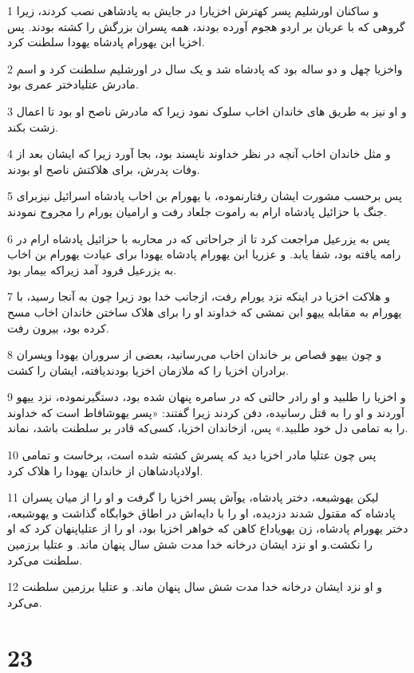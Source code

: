 \par 1 و ساکنان اورشلیم پسر کهترش اخزیارا در جایش به پادشاهی نصب کردند، زیرا گروهی که با عربان بر اردو هجوم آورده بودند، همه پسران بزرگش را کشته بودند. پس اخزیا ابن یهورام پادشاه یهودا سلطنت کرد.
\par 2 واخزیا چهل و دو ساله بود که پادشاه شد و یک سال در اورشلیم سلطنت کرد و اسم مادرش عتلیادختر عمری بود.
\par 3 و او نیز به طریق های خاندان اخاب سلوک نمود زیرا که مادرش ناصح او بود تا اعمال زشت بکند.
\par 4 و مثل خاندان اخاب آنچه در نظر خداوند ناپسند بود، بجا آورد زیرا که ایشان بعد از وفات پدرش، برای هلاکتش ناصح او بودند.
\par 5 پس برحسب مشورت ایشان رفتارنموده، با یهورام بن اخاب پادشاه اسرائیل نیزبرای جنگ با حزائیل پادشاه ارام به راموت جلعاد رفت و ارامیان یورام را مجروح نمودند.
\par 6 پس به یزرعیل مراجعت کرد تا از جراحاتی که در محاربه با حزائیل پادشاه ارام در رامه یافته بود، شفا یابد. و عزریا ابن یهورام پادشاه یهودا برای عیادت یهورام بن اخاب به یزرعیل فرود آمد زیراکه بیمار بود.
\par 7 و هلاکت اخزیا در اینکه نزد یورام رفت، ازجانب خدا بود زیرا چون به آنجا رسید، با یهورام به مقابله ییهو ابن نمشی که خداوند او را برای هلاک ساختن خاندان اخاب مسح کرده بود، بیرون رفت.
\par 8 و چون ییهو قصاص بر خاندان اخاب می‌رسانید، بعضی از سروران یهودا وپسران برادران اخزیا را که ملازمان اخزیا بودندیافته، ایشان را کشت.
\par 9 و اخزیا را طلبید و او رادر حالتی که در سامره پنهان شده بود، دستگیرنموده، نزد ییهو آوردند و او را به قتل رسانیده، دفن کردند زیرا گفتند: «پسر یهوشافاط است که خداوند را به تمامی دل خود طلبید.» پس، ازخاندان اخزیا، کسی‌که قادر بر سلطنت باشد، نماند.
\par 10 پس چون عتلیا مادر اخزیا دید که پسرش کشته شده است، برخاست و تمامی اولادپادشاهان از خاندان یهودا را هلاک کرد.
\par 11 لیکن یهوشبعه، دختر پادشاه، یوآش پسر اخزیا را گرفت و او را از میان پسران پادشاه که مقتول شدند دزدیده، او را با دایه‌اش در اطاق خوابگاه گذاشت و یهوشبعه، دختر یهورام پادشاه، زن یهویاداع کاهن که خواهر اخزیا بود، او را از عتلیاپنهان کرد که او را نکشت.و او نزد ایشان درخانه خدا مدت شش سال پنهان ماند. و عتلیا برزمین سلطنت می‌کرد.
\par 12 و او نزد ایشان درخانه خدا مدت شش سال پنهان ماند. و عتلیا برزمین سلطنت می‌کرد.
 
\chapter{23}

